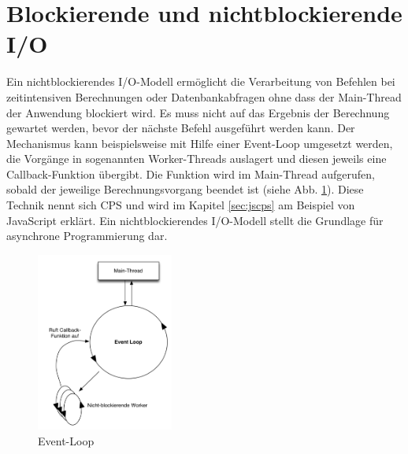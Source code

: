 \section{Blockierende und nichtblockierende \acs{I/O}}
 \label{sec:nonblocking}Ein nichtblockierendes I/O-Modell ermöglicht die Verarbeitung von Befehlen bei zeitintensiven Berechnungen oder Datenbankabfragen ohne dass der Main-Thread der Anwendung blockiert wird. Es muss nicht auf das Ergebnis der Berechnung gewartet werden, bevor der nächste Befehl ausgeführt werden kann. Der Mechanismus kann beispielsweise mit Hilfe einer Event-Loop umgesetzt werden, die Vorgänge in sogenannten Worker-Threads auslagert und diesen jeweils eine Callback-Funktion übergibt. Die Funktion wird im Main-Thread aufgerufen, sobald der jeweilige Berechnungsvorgang beendet ist (siehe Abb. \ref{fig:nonblocking}). Diese Technik nennt sich \acf{CPS} und wird im Kapitel \ref{sec:jscps} am Beispiel von JavaScript erklärt. Ein nichtblockierendes I/O-Modell stellt die Grundlage für asynchrone Programmierung dar.
\begin{figure}[H]
\centering
\includegraphics[width=0.4\textwidth]{images/nonblocking.png}
\caption[Event-Loop]{Event-Loop}
\label{fig:nonblocking}
\end{figure}
\acresetall
